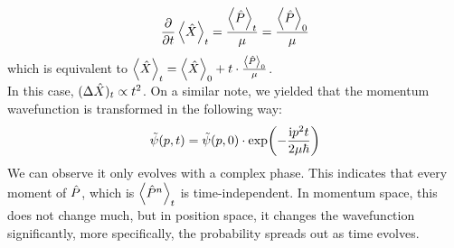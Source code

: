 $$\pdv{t} \expval{\hat{X}}_t = \frac{\expval{\hat{P}}_t}{\mu} = \frac{\expval{\hat{P}}_0}{\mu}$$
which is equivalent to $\expval{\hat{X}}_t = \expval{\hat{X}}_0 + t \cdot \frac{\expval{\hat{P}}_0}{\mu}$. \\
In this case, $(\Delta \hat{X})_t \propto t^2$. On a similar note, we yielded that the momentum wavefunction is transformed in the following way:
$$\tilde{\psi}(p, t) = \tilde{\psi}(p, 0) \cdot \exp(-\frac{\mathrm{i} p^2t}{2\mu\hbar})$$
We can observe it only evolves with a complex phase. This indicates that every moment of $\hat{P}$, which is $\expval{\hat{P}^n}_t$ is time-independent. In momentum space, this does not change much, but in position space, it changes the wavefunction significantly, more specifically, the probability spreads out as time evolves.

\newpage